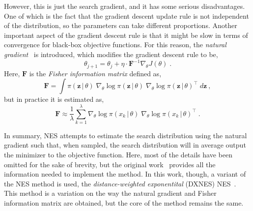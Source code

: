 However, this is just the search gradient, and it has some serious disadvantages. One of 
which is the fact that the gradient descent update rule is not independent of the 
distribution, so the parameters can take different proportions. Another important aspect of 
the gradient descent rule is that it might be slow in terms of convergence for black-box 
objective functions. For this reason, the \emph{natural gradient}~\cite{amariNaturalGradientWorks1998,amariWhyNaturalGradient1998} is introduced, which 
modifies the gradient descent rule to be,
\begin{equation}
    \theta_{j + 1} = \theta_{j} + \eta \cdot \bm{F}^{-1} \nabla_{\theta} J(\theta)
    \; .
    \label{eq:natural-gradient}
\end{equation}
Here, \(\bm{F}\) is the \emph{Fisher information matrix} defined as,
\begin{equation}
    \bm{F} = \int \pi(\bm{z} \, \vert \, \theta) \; 
    \nabla_{\theta} \log{\pi(\bm{z} \, \vert \, \theta)} \;
    {\nabla_{\theta} \log{\pi(\bm{z} \, \vert \, \theta)}}^{\top} \;
    d \bm{z}
    \: ,
    \label{eq:fisher-matrix}
\end{equation}
but in practice it is estimated as,
\begin{equation}
    \bm{F} \approx \frac{1}{\lambda} \sum_{k=1}^{\lambda} 
    \nabla_{\theta} \log{\pi(x_k \, \vert \, \theta)} \;
    {\nabla_{\theta} \log{\pi(x_k \, \vert \, \theta)}}^{\top}
    \; .
    \label{eq:fisher-estimation}
\end{equation}

In summary, NES attempts to estimate the search distribution using the natural gradient 
such that, when sampled, the search distribution will in average output the minimizer to 
the objective function. Here, most of the details have been omitted for the sake of 
brevity, but the original work~\cite{wierstraNaturalEvolutionStrategies2014a} provides all 
the information needed to implement the method. In this work, though, a variant of the NES 
method is used, the \emph{distance-weighted exponentital} (DXNES)
NES~\cite{fukushimaProposalDistanceweightedExponential2011,nomuraDistanceweightedExponentialNatural2021}. 
This method is a variation on the way the natural gradient and Fisher information matrix 
are obtained, but the core of the method remains the same.